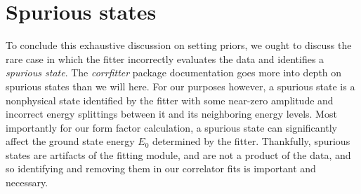 \section{Spurious states}\label{sec:spurious_states}
To conclude this exhaustive discussion on setting priors, we ought to discuss the rare case in which the fitter incorrectly evaluates the data and identifies a \textit{spurious state}. The \textit{corrfitter} package documentation \cite{peter_lepage_2021_5733391} goes more into depth on spurious states than we will here.  For our purposes however, a spurious state is a nonphysical state identified by the fitter with some near-zero amplitude and incorrect energy splittings between it and its neighboring energy levels.  Most importantly for our form factor calculation, a spurious state can significantly affect the ground state energy $E_0$ determined by the fitter. Thankfully, spurious states are artifacts of the fitting module, and are not a product of the data, and so identifying and removing them in our correlator fits is important and necessary.

